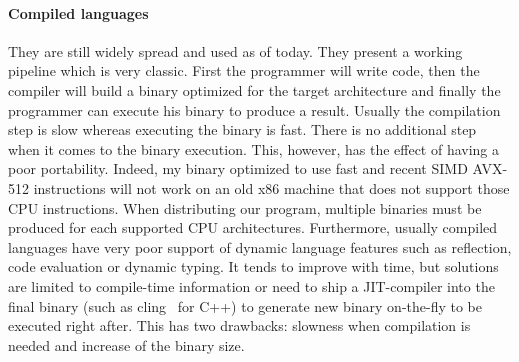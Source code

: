\paragraph{Compiled languages} They are still widely spread and used as of today. They present a working pipeline which
is very classic. First the programmer will write code, then the compiler will build a binary optimized for the target
architecture and finally the programmer can execute his binary to produce a result. Usually the compilation step is slow
whereas executing the binary is fast. There is no additional step when it comes to the binary execution. This, however,
has the effect of having a poor portability. Indeed, my binary optimized to use fast and recent SIMD AVX-512
instructions will not work on an old x86 machine that does not support those CPU instructions. When distributing our
program, multiple binaries must be produced for each supported CPU architectures. Furthermore, usually compiled
languages have very poor support of dynamic language features such as reflection, code evaluation or dynamic typing. It
tends to improve with time, but solutions are limited to compile-time information or need to ship a JIT-compiler into
the final binary (such as cling~\parencite{vassilev.2012.cling} for C++) to generate new binary on-the-fly to be
executed right after. This has two drawbacks: slowness when compilation is needed and increase of the binary size.

